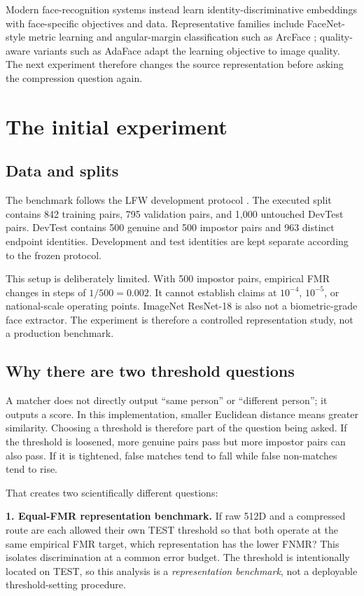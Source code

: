 \documentclass[10pt,a4paper]{article}
\begin{document}
Modern face-recognition systems instead learn identity-discriminative embeddings with
face-specific objectives and data. Representative families include FaceNet-style metric
learning \cite{facenet2015} and angular-margin classification such as ArcFace
\cite{arcface2019}; quality-aware variants such as AdaFace \cite{adaface2022} adapt the
learning objective to image quality. The next experiment therefore changes the source
representation before asking the compression question again.

\section{The initial experiment}\label{sec:initial}

\subsection{Data and splits}

The benchmark follows the LFW development protocol \cite{lfw2007}. The executed split
contains 842 training pairs, 795 validation pairs, and 1,000 untouched DevTest pairs.
DevTest contains 500 genuine and 500 impostor pairs and 963 distinct endpoint identities.
Development and test identities are kept separate according to the frozen protocol.

This setup is deliberately limited. With 500 impostor pairs, empirical FMR changes in steps
of $1/500=0.002$. It cannot establish claims at $10^{-4}$, $10^{-5}$, or national-scale
operating points. ImageNet ResNet-18 is also not a biometric-grade face extractor. The
experiment is therefore a controlled representation study, not a production benchmark.

\subsection{Why there are two threshold questions}

A matcher does not directly output ``same person'' or ``different person''; it outputs a
score. In this implementation, smaller Euclidean distance means greater similarity. Choosing
a threshold is therefore part of the question being asked. If the threshold is loosened,
more genuine pairs pass but more impostor pairs can also pass. If it is tightened, false
matches tend to fall while false non-matches tend to rise.

That creates two scientifically different questions:

\textbf{1. Equal-FMR representation benchmark.} If raw 512D and a compressed route are each
allowed their own TEST threshold so that both operate at the same empirical FMR target, which
representation has the lower FNMR? This isolates discrimination at a common error budget.
The threshold is intentionally located on TEST, so this analysis is a \emph{representation
benchmark}, not a deployable threshold-setting procedure.
\end{document}
